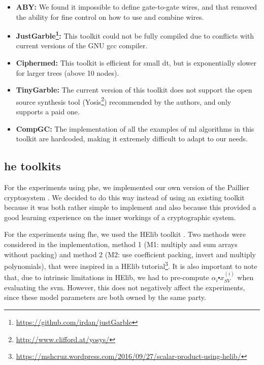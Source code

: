 \begin{itemize}
    \setlength\itemsep{1em}
    \item\textbf{ABY\cite{demmler2015aby}:} We found it impossible to define gate-to-gate wires, and that removed the ability for fine control on how to use and combine wires.

    \item\textbf{JustGarble\footnote{\url{https://github.com/irdan/justGarble}}:} This toolkit could not be fully compiled due to conflicts with current versions of the GNU gcc compiler.

    \item\textbf{Ciphermed\cite{bost2015machine}:} This toolkit is efficient for small \ac{dt}, but is exponentially slower for larger trees (above 10 nodes).

    \item\textbf{TinyGarble\cite{songhori2015tinygarble}:} The current version of this toolkit does not support the open source synthesis tool (Yosis\footnote{\url{http://www.clifford.at/yosys/}}) recommended by the authors, and only supports a paid one.

    \item\textbf{CompGC\cite{groce2016compgc}:} The implementation of all the examples of \ac{ml} algorithms in this toolkit are hardcoded, making it extremely difficult to adapt to our needs.

\end{itemize}

\subsection{\acl{he} toolkits}

For the experiments using \ac{phe}, we implemented our own version of the Paillier cryptosystem \cite{paillier1999public}. We decided to do this way instead of using an existing toolkit because it was both rather simple to implement and also because this provided a good learning experience on the inner workings of a cryptographic system.

For the experiments using \ac{fhe}, we used the HElib toolkit \cite{halevi2014helib}. Two methods were considered in the implementation, method 1 (M1: multiply and sum arrays without packing) and method 2 (M2: use coefficient packing, invert and multiply polynomials), that were inspired in a HElib tutorial\footnote{\url{https://mshcruz.wordpress.com/2016/09/27/scalar-product-using-helib/}}. It is also important to note that, due to intrinsic limitations in HElib, we had to pre-compute $\alpha_i\centerdot x_{SV}^{(i)}$ when evaluating the \ac{svm}. However, this does not negatively affect the experiments, since these model parameters are both owned by the same party.



